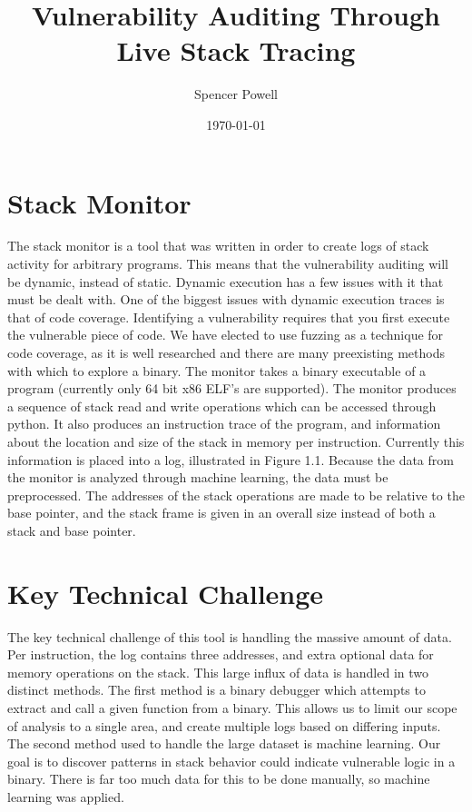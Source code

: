 \documentclass{article}
\title{Vulnerability Auditing Through Live Stack Tracing}
\author{Spencer Powell}
\date{\today}
\begin{document}
\maketitle

\section{Stack Monitor}

The stack monitor is a tool that was written in order to create logs of stack activity for arbitrary programs. This means that the vulnerability auditing will be dynamic, instead of static. Dynamic execution has a few issues with it that must be dealt with. One of the biggest issues with dynamic execution traces is that of code coverage. Identifying a vulnerability requires that you first execute the vulnerable piece of code. We have elected to use fuzzing as a technique for code coverage, as it is well researched and there are many preexisting methods with which to explore a binary. The monitor takes a binary executable of a program (currently only 64 bit x86 ELF's are supported). The monitor produces a sequence of stack read and write operations which can be accessed through python. It also produces an instruction trace of the program, and information about the location and size of the stack in memory per instruction. Currently this information is placed into a log, illustrated in Figure 1.1. Because the data from the monitor is analyzed through machine learning, the data must be preprocessed. The addresses of the stack operations are made to be relative to the base pointer, and the stack frame is given in an overall size instead of both a stack and base pointer.

\section{Key Technical Challenge}

The key technical challenge of this tool is handling the massive amount of data. Per instruction, the log contains three addresses, and extra optional data for memory operations on the stack. This large influx of data is handled in two distinct methods. The first method is a binary debugger which attempts to extract and call a given function from a binary. This allows us to limit our scope of analysis to a single area, and create multiple logs based on differing inputs. The second method used to handle the large dataset is machine learning. Our goal is to discover patterns in stack behavior could indicate vulnerable logic in a binary. There is far too much data for this to be done manually, so machine learning was applied.
\end{document}
